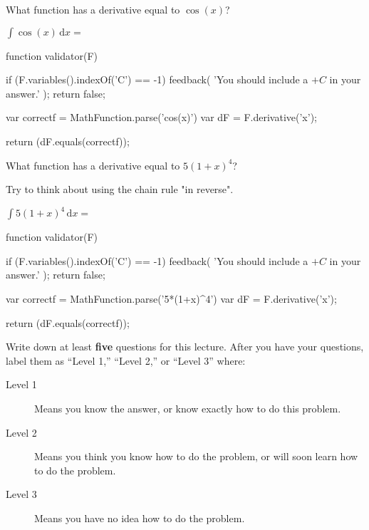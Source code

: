 \documentclass{ximera}
\begin{document}
\begin{question}
	\begin{hint}
		What function has a derivative equal to $\cos(x)$?
	\end{hint}
 	$\displaystyle \int \cos(x) \, \mathrm{d}x = $ 
	\begin{expression-answer}
 function validator(F) {
   if (F.variables().indexOf('C') == -1) {
     feedback( 'You should include a $+C$ in your answer.' );
     return false;
   }
   
   var correctf = MathFunction.parse('cos(x)')
   var dF = F.derivative('x');
   
   return (dF.equals(correctf));
 }
\end{expression-answer}	
	
\end{question}

\begin{question}
	\begin{hint}
		What function has a derivative equal to $5(1+x)^4$?
	\end{hint}
	\begin{hint}
		Try to think about using the chain rule "in reverse".
	\end{hint}
 	$\displaystyle \int 5(1+x)^4 \,  \mathrm{d}x = $ 
	\begin{expression-answer}
 function validator(F) {
   if (F.variables().indexOf('C') == -1) {
     feedback( 'You should include a $+C$ in your answer.' );
     return false;
   }
   
   var correctf = MathFunction.parse('5*(1+x)^4')
   var dF = F.derivative('x');
   
   return (dF.equals(correctf));
 }
\end{expression-answer}	
	
\end{question}


\begin{question}
Write down at least \textbf{five} questions for this lecture. After
you have your questions, label them as ``Level 1,'' ``Level 2,'' or ``Level 3'' where:
\begin{description}
\item[Level 1] Means you know the answer, or know exactly how to do this problem.
\item[Level 2] Means you think you know how to do the problem, or will soon learn how to do the problem.
\item[Level 3] Means you have no idea how to do the problem. 
\end{description}
\begin{freeResponse}
\end{freeResponse}
\end{question}
\end{document}
